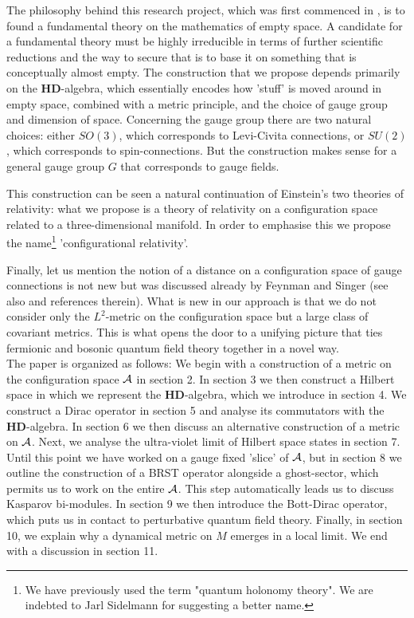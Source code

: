 \documentclass[letterpaper,11pt]{article}
\def\ca{{\cal A}}
\begin{document}
The philosophy behind this research project, which was first commenced in \cite{Aastrup:2005yk}, is to found a fundamental theory on the mathematics of empty space. A candidate for a fundamental theory must be highly irreducible in terms of further scientific reductions and the way to secure that is to base it on something that is conceptually almost empty. The construction that we propose depends primarily  on the $\mathbf{HD}$-algebra, which essentially encodes how 'stuff' is moved around in empty space, combined with a metric principle, and the choice of gauge group and dimension of space. Concerning the gauge group there are two natural choices: either $SO(3)$, which corresponds to Levi-Civita connections, or $SU(2)$, which corresponds to spin-connections. But the construction makes sense for a general gauge group $G$ that corresponds to gauge fields.

This construction can be seen a natural continuation of Einstein's two theories of relativity: what we propose is a theory of relativity on a configuration space related to a three-dimensional manifold. In order to emphasise this we propose the name\footnote{We have previously used the term "quantum holonomy theory". We are indebted to Jarl Sidelmann for suggesting a better name.} 'configurational relativity'.







Finally, let us mention the notion of a distance on a configuration space of gauge connections is not new but
was discussed already by Feynman \cite{Feynman:1981ss} and Singer \cite{Singer:1981xw} (see also \cite{Orland:1996hm} and references therein). What is new in our approach is that we do not consider only the $L^2$-metric on the configuration space but a large class of covariant metrics. This is what opens the door to a unifying picture that ties fermionic and bosonic quantum field theory together in a novel way.\\

The paper is organized as follows: We begin with a construction of a metric on the configuration space $\ca$ in section 2. In section 3 we then construct a Hilbert space in which we represent the $\mathbf{HD}$-algebra, which we introduce in section 4. We construct a Dirac operator in section 5 and analyse its commutators with the $\mathbf{HD}$-algebra. In section 6 we then discuss an alternative construction of a metric on $\ca$. Next, we analyse the ultra-violet limit of Hilbert space states in section 7. Until this point we have worked on a gauge fixed 'slice' of $\ca$, but in section 8 we outline the construction of a BRST operator alongside a ghost-sector, which permits us to work on the entire $\ca$. This step automatically leads us to discuss Kasparov bi-modules. In section 9 we then introduce the Bott-Dirac operator, which puts us in contact to perturbative quantum field theory. Finally, in section 10, we explain why a dynamical metric on $M$ emerges in a local limit. We end with a discussion in section 11.
\end{document}
